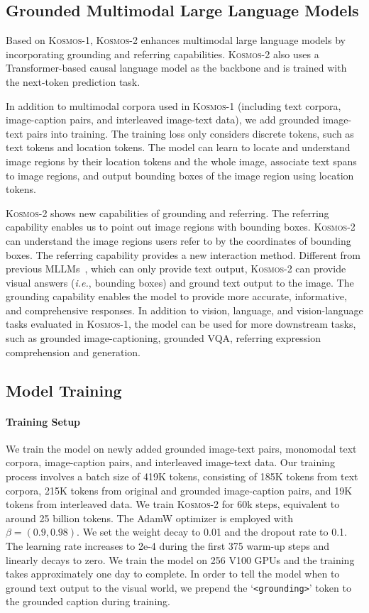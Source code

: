 \documentclass{article}
\newcommand\kosmos{\textsc{Kosmos-1}}
\newcommand\our{\textsc{Kosmos-2}}
\newcommand\ie{\textit{i.e.}}
\begin{document}
\subsection{Grounded Multimodal Large Language Models}

Based on \kosmos{}, \our{} enhances multimodal large language models by incorporating grounding and referring capabilities.
\our{} also uses a Transformer-based causal language model as the backbone and is trained with the next-token prediction task.

In addition to multimodal corpora used in \kosmos{} (including text corpora, image-caption pairs, and interleaved image-text data), we add grounded image-text pairs into training.
The training loss only considers discrete tokens, such as text tokens and location tokens.
The model can learn to locate and understand image regions by their location tokens and the whole image, associate text spans to image regions, and output bounding boxes of the image region using location tokens.

\our{} shows new capabilities of grounding and referring.
The referring capability enables us to point out image regions with bounding boxes.
\our{} can understand the image regions users refer to by the coordinates of bounding boxes.
The referring capability provides a new interaction method.
Different from previous MLLMs~\cite{flamingo,metalm,kosmos-1}, which can only provide text output, \our{} can provide visual answers (\ie, bounding boxes) and ground text output to the image.
The grounding capability enables the model to provide more accurate, informative, and comprehensive responses.
In addition to vision, language, and vision-language tasks evaluated in \kosmos{}, the model can be used for more downstream tasks, such as grounded image-captioning, grounded VQA, referring expression comprehension and generation.


\subsection{Model Training}


\paragraph{Training Setup}
We train the model on newly added grounded image-text pairs, monomodal text corpora, image-caption pairs, and interleaved image-text data. 
Our training process involves a batch size of 419K tokens, consisting of 185K tokens from text corpora, 215K tokens from original and grounded image-caption pairs, and 19K tokens from interleaved data.
We train \our{} for 60k steps, equivalent to around 25 billion tokens. The AdamW optimizer is employed with $\beta=(0.9,0.98)$. 
We set the weight decay to 0.01 and the dropout rate to 0.1. 
The learning rate increases to 2e-4 during the first 375 warm-up steps and linearly decays to zero.
We train the model on 256 V100 GPUs and the training takes approximately one day to complete.
In order to tell the model when to ground text output to the visual world, we prepend the `\texttt{<grounding>}' token to the grounded caption during training.
\end{document}
